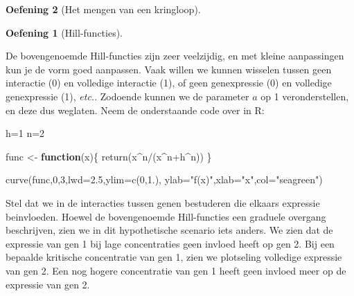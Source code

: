 \documentclass[
  a4paper,
]{scrbook}
\newenvironment{Shaded}{\begin{snugshade}}{\end{snugshade}}
\newcommand{\AttributeTok}[1]{\textcolor[rgb]{0.40,0.45,0.13}{#1}}
\newcommand{\ControlFlowTok}[1]{\textcolor[rgb]{0.00,0.23,0.31}{\textbf{#1}}}
\newcommand{\DecValTok}[1]{\textcolor[rgb]{0.68,0.00,0.00}{#1}}
\newcommand{\FloatTok}[1]{\textcolor[rgb]{0.68,0.00,0.00}{#1}}
\newcommand{\FunctionTok}[1]{\textcolor[rgb]{0.28,0.35,0.67}{#1}}
\newcommand{\NormalTok}[1]{\textcolor[rgb]{0.00,0.23,0.31}{#1}}
\newcommand{\OtherTok}[1]{\textcolor[rgb]{0.00,0.23,0.31}{#1}}
\newcommand{\SpecialCharTok}[1]{\textcolor[rgb]{0.37,0.37,0.37}{#1}}
\newcommand{\StringTok}[1]{\textcolor[rgb]{0.13,0.47,0.30}{#1}}
\theoremstyle{definition}
\newtheorem{exercise}{Oefening}[chapter]
\theoremstyle{remark}
\begin{document}
\begin{exercise}[Het mengen van een
kringloop]
\begin{exercise}[Hill-functies]\protect\hypertarget{exr-hillfuncties}{}\label{exr-hillfuncties}

De bovengenoemde Hill-functies zijn zeer veelzijdig, en met kleine
aanpassingen kun je de vorm goed aanpassen. Vaak willen we kunnen
wisselen tussen geen interactie (0) en volledige interactie (1), of geen
genexpressie (0) en volledige genexpressie (1), \emph{etc.}. Zodoende
kunnen we de parameter \(a\) op 1 veronderstellen, en deze dus weglaten.
Neem de onderstaande code over in R:

\begin{Shaded}
\begin{Highlighting}[]
\NormalTok{h}\OtherTok{=}\DecValTok{1}
\NormalTok{n}\OtherTok{=}\DecValTok{2}

\NormalTok{func }\OtherTok{\textless{}{-}} \ControlFlowTok{function}\NormalTok{(x)\{}
  \FunctionTok{return}\NormalTok{(x}\SpecialCharTok{\^{}}\NormalTok{n}\SpecialCharTok{/}\NormalTok{(x}\SpecialCharTok{\^{}}\NormalTok{n}\SpecialCharTok{+}\NormalTok{h}\SpecialCharTok{\^{}}\NormalTok{n))}
\NormalTok{\}}

\FunctionTok{curve}\NormalTok{(func,}\DecValTok{0}\NormalTok{,}\DecValTok{3}\NormalTok{,}\AttributeTok{lwd=}\FloatTok{2.5}\NormalTok{,}\AttributeTok{ylim=}\FunctionTok{c}\NormalTok{(}\DecValTok{0}\NormalTok{,}\FloatTok{1.}\NormalTok{), }
      \AttributeTok{ylab=}\StringTok{"f(x)"}\NormalTok{,}\AttributeTok{xlab=}\StringTok{"x"}\NormalTok{,}\AttributeTok{col=}\StringTok{"seagreen"}\NormalTok{)}
\end{Highlighting}
\end{Shaded}

Stel dat we in de interacties tussen genen bestuderen die elkaars
expressie beinvloeden. Hoewel de bovengenoemde Hill-functies een
graduele overgang beschrijven, zien we in dit hypothetische scenario
iets anders. We zien dat de expressie van gen 1 bij lage concentraties
geen invloed heeft op gen 2. Bij een bepaalde kritische concentratie van
gen 1, zien we plotseling volledige expressie van gen 2. Een nog hogere
concentratie van gen 1 heeft geen invloed meer op de expressie van gen
2.


\end{exercise}
\end{exercise}
\end{document}
